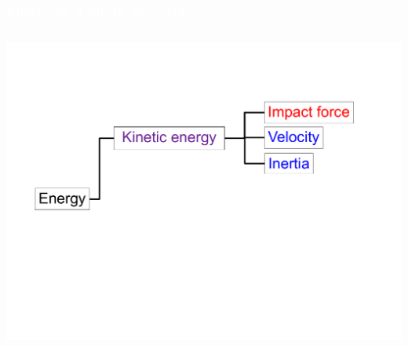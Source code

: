 \begin{frame}[noframenumbering]
\frametitle{{\textcolor{white}{Energy as a safety indicator}}}

\begin{columns}
\column{.95\paperwidth}

\begin{center}                
\includegraphics[width=1\textwidth ]{figures/fin05.pdf}
\end{center}       

\end{columns}

\end{frame}





